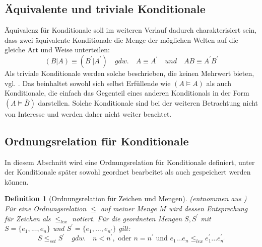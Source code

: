 \documentclass[12pt,a4paper]{article}
\newtheorem{theorem}{Definition}
\begin{document}
\subsection{Äquivalente und triviale Konditionale}
\label{sec:äquivalenz-konditionale} %
Äquivalenz für Konditionale soll im weiteren Verlauf dadurch charakterisiert sein, dass zwei äquivalente Konditionale die Menge der möglichen Welten auf die gleiche Art und Weise unterteilen:
\begin{equation}
(B|A)\equiv (B^\prime|A^\prime) \quad gdw. \quad A\equiv A^\prime \quad und \quad AB \equiv A^\prime B^\prime
\end{equation}
Als triviale Konditionale werden solche beschrieben, die keinen Mehrwert bieten, vgl. \cite{beierle19}. Das beinhaltet sowohl sich selbst Erfüllende wie $(A \models A)$ als auch Konditionale, die einfach das Gegenteil eines anderen Konditionals in der Form $(A \models \overline{B})$ darstellen. Solche Konditionale sind bei der weiteren Betrachtung nicht von Interesse und werden daher nicht weiter beachtet.


\subsection{Ordnungsrelation für Konditionale}
\label{sec:ordnungsrelation}
In diesem Abschnitt wird eine Ordnungsrelation für Konditionale definiert, unter der Konditionale später sowohl geordnet bearbeitet als auch gespeichert werden können.
\begin{theorem}[Ordnungsrelation für Zeichen und Mengen](entnommen aus \cite{beierle19}) \ \\
Für eine Ordnungsrelation $\leqslant$ auf meiner Menge $M$ wird dessen Entsprechung für Zeichen als $\leqslant_{lex}$ notiert. Für die geordneten Mengen $S, S^\prime$ mit $S = \{e_1, ..., e_n\}$ und $S^\prime = \{e_{1}, ... , e_{n\prime}\}$ gilt:
\begin{equation}
 S \leqslant_{set} S ^\prime \quad gdw. \quad n<n^\prime, \text{ oder } n = n ^\prime \text{ und } e_1...e_n  \leqslant_{lex}  e_1^\prime ... e_{n^\prime}^\prime
\end{equation}
\label{def:sortierung-konditionale}
\end{theorem}
\end{document}
